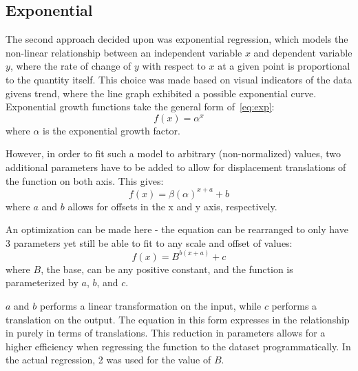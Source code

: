 \documentclass[12pt]{mcmthesis}
\begin{document}
    \subsection{Exponential}
    The second approach decided upon was exponential regression, which models the non-linear relationship between an independent variable $x$ and dependent variable $y$, where the rate of change of $y$ with respect to $x$ at a given point is proportional to the quantity itself.
    This choice was made based on visual indicators of the data given\textquotesingle s trend, where the line graph exhibited a possible exponential curve.
    Exponential growth functions take the general form of~\eqref{eq:exp}:
%
    \begin{equation}
        f(x) = \alpha^x
        \label{eq:exp}
    \end{equation}
%
    \noindent where $\alpha$ is the exponential growth factor.

    However, in order to fit such a model to arbitrary (non-normalized) values, two additional parameters have to be added to allow for displacement translations of the function on both axis. This gives:
%
    \begin{equation}
        f(x) = \beta (\alpha)^{x + a} + b
        \label{eq:exp2}
    \end{equation}
%
    \noindent where $a$ and $b$ allows for offsets in the x and y axis, respectively.

    An optimization can be made here - the equation can be rearranged to only have 3 parameters yet still be able to fit to any scale and offset of values:
%
    \begin{equation}
        f(x) = B^{b (x + a)} + c
        \label{eq:exp3}
    \end{equation}
%
    \noindent where $B$, the base, can be any positive constant, and the function is parameterized by $a$, $b$, and $c$.

    $a$ and $b$ performs a linear transformation on the input, while $c$ performs a translation on the output.
    The equation in this form expresses in the relationship in purely in terms of translations.
    This reduction in parameters allows for a higher efficiency when regressing the function to the dataset programmatically.
    In the actual regression, 2 was used for the value of $B$.
\end{document}

